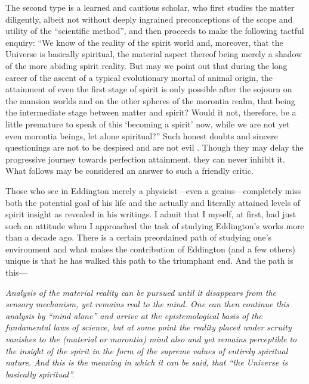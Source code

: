 \documentclass[12pt]{book}
\begin{document}
The second type is a learned and cautious scholar, who first studies the matter diligently, albeit not without deeply ingrained
preconceptions of the scope and utility of the ``scientific method'', and then proceeds to make the following tactful enquiry:
``We know of the reality of the spirit world and, moreover, that the Universe is basically spiritual, the material aspect
thereof being merely a shadow of the more abiding spirit reality.
But may we point out that during the long career of the ascent of a typical evolutionary mortal of animal origin, the attainment
of even the first stage of spirit is only possible after the sojourn on the mansion worlds and on the other spheres of the morontia
realm, that being the intermediate stage between matter and spirit?
Would it not, therefore, be a little premature to speak of this `becoming a spirit' now, while we are not yet even morontia beings,
let alone spiritual?''
Such honest doubts and sincere questionings are not to be despised and are not evil .
Though they may delay the progressive journey towards perfection attainment, they can never inhibit it.
What follows may be considered an answer to such a friendly critic.

Those who see in Eddington merely a physicist---even a genius---completely miss both the potential goal of his life and the
actually and literally attained levels of spirit insight as revealed in his writings.
I admit that I myself, at first, had just such an attitude when I approached the task of studying Eddington's works more than
a decade ago.
There is a certain preordained path of studying one's environment and what makes the contribution of Eddington (and a few others)
unique is that he has walked this path to the triumphant end. And the path is this---

\emph{Analysis of the material reality can be pursued until it disappears from the sensory mechanism, yet remains real to the mind.
One can then continue this analysis by ``mind alone'' and arrive at the epistemological basis of the fundamental laws of science,
but at some point the reality placed under scruity vanishes to the (material or morontia) mind also and yet remains perceptible to the insight
of the spirit in the form of the supreme values of entirely spiritual nature.
And this is the meaning in which it can be said, that ``the Universe is basically spiritual''.}
\end{document}
